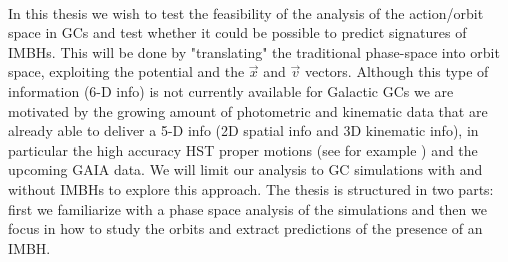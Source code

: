 \\\par In this thesis we wish to test the feasibility of the analysis of the action/orbit space in \acp{GC} and test whether it could be possible to predict  signatures of \acp{IMBH}. This will be done by "translating" the traditional phase-space into orbit space, exploiting the potential and the \(\vec{x}\) and \(\vec{v}\) vectors. Although this type of information (6-D info) is not currently available for Galactic \acp{GC} we are motivated by the growing amount of photometric and kinematic data that are already able to deliver a 5-D info (2D spatial info and 3D kinematic info), in particular the high accuracy \ac{HST} proper motions (see for example \citet{2014ApJ...797..115B}) and the upcoming GAIA data. We will limit our analysis to \ac{GC} simulations with and without \acp{IMBH} to explore this approach. The thesis is structured in two parts: first we familiarize with a phase space analysis of the simulations and then we focus in how to study the orbits and extract predictions of the presence of an \ac{IMBH}.


